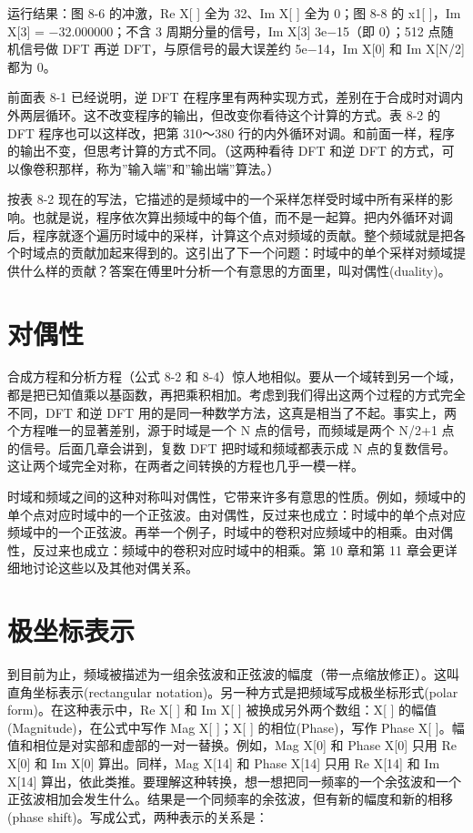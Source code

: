 运行结果：图 8-6 的冲激，Re X{[} {]} 全为 32、Im X{[} {]} 全为 0；图 8-8
的 x1{[} {]}，Im X{[}3{]} = −32.000000；不含 3 周期分量的信号，Im
X{[}3{]}  3e−15（即 0）；512 点随机信号做 DFT 再逆
DFT，与原信号的最大误差约 5e−14，Im X{[}0{]} 和 Im X{[}N/2{]} 都为 0。

前面表 8-1 已经说明，逆 DFT
在程序里有两种实现方式，差别在于合成时对调内外两层循环。这不改变程序的输出，但改变你看待这个计算的方式。表
8-2 的 DFT 程序也可以这样改，把第 310～380
行的内外循环对调。和前面一样，程序的输出不变，但思考计算的方式不同。（这两种看待
DFT 和逆 DFT 的方式，可以像卷积那样，称为''输入端''和''输出端''算法。）

按表 8-2
现在的写法，它描述的是频域中的一个采样怎样受时域中所有采样的影响。也就是说，程序依次算出频域中的每个值，而不是一起算。把内外循环对调后，程序就逐个遍历时域中的采样，计算这个点对频域的贡献。整个频域就是把各个时域点的贡献加起来得到的。这引出了下一个问题：时域中的单个采样对频域提供什么样的贡献？答案在傅里叶分析一个有意思的方面里，叫对偶性(duality)。

\section{对偶性}

合成方程和分析方程（公式 8-2 和
8-4）惊人地相似。要从一个域转到另一个域，都是把已知值乘以基函数，再把乘积相加。考虑到我们得出这两个过程的方式完全不同，DFT
和逆 DFT
用的是同一种数学方法，这真是相当了不起。事实上，两个方程唯一的显著差别，源于时域是一个
N 点的信号，而频域是两个 N/2+1 点的信号。后面几章会讲到，复数 DFT
把时域和频域都表示成 N
点的复数信号。这让两个域完全对称，在两者之间转换的方程也几乎一模一样。

时域和频域之间的这种对称叫对偶性，它带来许多有意思的性质。例如，频域中的单个点对应时域中的一个正弦波。由对偶性，反过来也成立：时域中的单个点对应频域中的一个正弦波。再举一个例子，时域中的卷积对应频域中的相乘。由对偶性，反过来也成立：频域中的卷积对应时域中的相乘。第
10 章和第 11 章会更详细地讨论这些以及其他对偶关系。

\section{极坐标表示}

到目前为止，频域被描述为一组余弦波和正弦波的幅度（带一点缩放修正）。这叫直角坐标表示(rectangular
notation)。另一种方式是把频域写成极坐标形式(polar
form)。在这种表示中，Re X{[} {]} 和 Im X{[} {]} 被换成另外两个数组：X{[}
{]} 的幅值(Magnitude)，在公式中写作 Mag X{[} {]}；X{[} {]}
的相位(Phase)，写作 Phase X{[}
{]}。幅值和相位是对实部和虚部的一对一替换。例如，Mag X{[}0{]} 和 Phase
X{[}0{]} 只用 Re X{[}0{]} 和 Im X{[}0{]} 算出。同样，Mag X{[}14{]} 和
Phase X{[}14{]} 只用 Re X{[}14{]} 和 Im X{[}14{]}
算出，依此类推。要理解这种转换，想一想把同一频率的一个余弦波和一个正弦波相加会发生什么。结果是一个同频率的余弦波，但有新的幅度和新的相移(phase
shift)。写成公式，两种表示的关系是：


